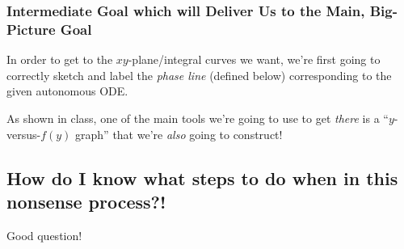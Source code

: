\documentclass[12pt]{article}
\theoremstyle{definition}
\theoremstyle{underl}
\begin{document}
	\subsubsection*{Intermediate Goal which will Deliver Us to the Main, Big-Picture Goal}
	In order to get to the $xy$-plane/integral curves we want, we're first going to correctly sketch and label the \textit{phase line} (defined below) corresponding to the given autonomous ODE. 
	
	As shown in class, one of the main tools we're going to use to get \textit{there} is a ``$y$-versus-$f(y)$ graph'' that we're \textit{also} going to construct!


	\subsection*{How do I know what steps to do when in this nonsense process?!}
	Good question!
	
\end{document}
